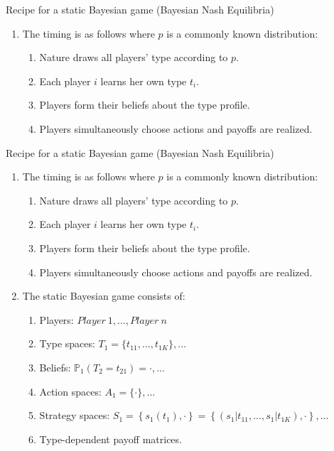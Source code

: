 \begin{frame}{Recipe for a static Bayesian game (Bayesian Nash Equilibria)}
    \begin{enumerate}
      \item The timing is as follows where $p$ is a commonly known distribution:
      \begin{enumerate}\normalsize
        \item Nature draws all players' type according to $p$.
        \item Each player $i$ learns her own type $t_{i}$.
        \item Players form their beliefs about the type profile.
        \item Players simultaneously choose actions and payoffs are realized.
      \end{enumerate}
    \end{enumerate}
    \vfill\null
\end{frame}
\begin{frame}{Recipe for a static Bayesian game (Bayesian Nash Equilibria)}
    \begin{enumerate}
      \item The timing is as follows where $p$ is a commonly known distribution:
      \begin{enumerate}\normalsize
        \item Nature draws all players' type according to $p$.
        \item Each player $i$ learns her own type $t_{i}$.
        \item Players form their beliefs about the type profile.
        \item Players simultaneously choose actions and payoffs are realized.
      \end{enumerate}
      \item The static Bayesian game consists of:
      \begin{enumerate}\normalsize
        \item Players: $Player\ 1,...,Player\ n$
        \item Type spaces: $T_1=\{t_{11},...,t_{1K}\},...$
        \item Beliefs: $\mathbb{P}_1(T_2=t_{21})=\cdot,...$
        \item Action spaces: $A_1=\{\cdot\},...$
        \item Strategy spaces: $S_1=\left\{s_1(t_1),\cdot\right\}=\left\{(s_1|t_{11},...,s_1|t_{1K}),\cdot\right\},...$
        \item Type-dependent payoff matrices.
      \end{enumerate}
    \end{enumerate}
    \vfill\null
\end{frame}
